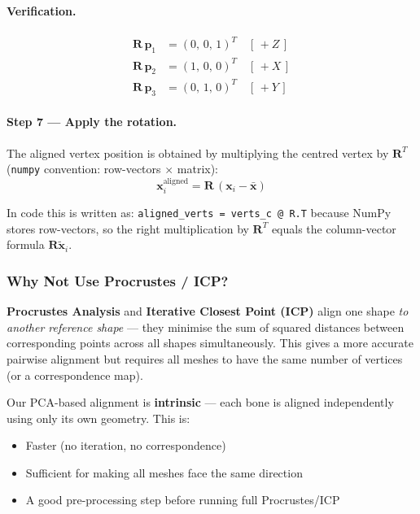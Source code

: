 \documentclass[12pt,a4paper]{article}
\begin{document}
\paragraph{Verification.}
\begin{align}
    \mathbf{R}\,\mathbf{p}_1 &= (0,\,0,\,1)^T \quad [\,+Z\,]\\
    \mathbf{R}\,\mathbf{p}_2 &= (1,\,0,\,0)^T \quad [\,+X\,]\\
    \mathbf{R}\,\mathbf{p}_3 &= (0,\,1,\,0)^T \quad [\,+Y\,]
\end{align}

\paragraph{Step 7 — Apply the rotation.}
The aligned vertex position is obtained by multiplying the centred vertex by
$\mathbf{R}^T$ (\texttt{numpy} convention: row-vectors $\times$ matrix):
\begin{equation}
    \boxed{
        \mathbf{x}_i^{\text{aligned}} = \mathbf{R}\,(\mathbf{x}_i - \bar{\mathbf{x}})
    }
    \label{eq:aligned}
\end{equation}

In code this is written as:
\texttt{aligned\_verts = verts\_c @ R.T}
because NumPy stores row-vectors, so the right multiplication by $\mathbf{R}^T$
equals the column-vector formula $\mathbf{R}\tilde{\mathbf{x}}_i$.

\subsubsection{Why Not Use Procrustes / ICP?}

\textbf{Procrustes Analysis} and \textbf{Iterative Closest Point (ICP)} align
one shape \emph{to another reference shape} — they minimise the sum of squared
distances between corresponding points across all shapes simultaneously.  This
gives a more accurate pairwise alignment but requires all meshes to have the
same number of vertices (or a correspondence map).

Our PCA-based alignment is \textbf{intrinsic} — each bone is aligned
independently using only its own geometry.  This is:
\begin{itemize}
    \item Faster (no iteration, no correspondence)
    \item Sufficient for making all meshes face the same direction
    \item A good pre-processing step before running full Procrustes/ICP
\end{itemize}
\end{document}

